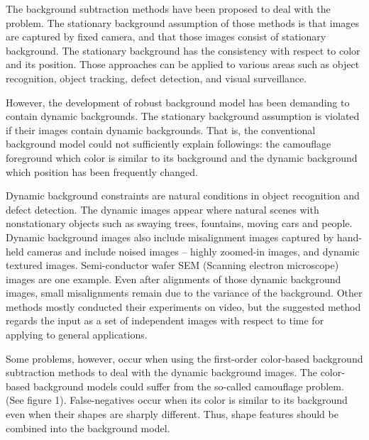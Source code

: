 \documentclass[a4paper,twocolumn, 10pt]{article}
\begin{document}
  The background subtraction methods have been proposed to deal with the problem. The stationary background assumption of those methods is that images are captured by fixed camera, and that those images consist of stationary background. The stationary background has the consistency with respect to color and its position. Those approaches can be applied to various areas such as object recognition, object tracking, defect detection, and visual surveillance.

  However, the development of robust background model has been demanding to contain dynamic backgrounds. The stationary background assumption is violated if their images contain dynamic backgrounds. That is, the conventional background model could not sufficiently explain followings: the camouflage foreground which color is similar to its background and the dynamic background which position has been frequently changed.
 
  Dynamic background constraints are natural conditions in object recognition and defect detection. The dynamic images appear where natural scenes with nonstationary objects such as swaying trees, fountains, moving cars and people. Dynamic background images also include misalignment images captured by hand-held cameras and include noised images – highly zoomed-in images, and dynamic textured images. Semi-conductor wafer SEM (Scanning electron microscope) images are one example. Even after alignments of those dynamic background images, small misalignments remain due to the variance of the background. Other methods mostly conducted their experiments on video, but the suggested method regards the input as a set of independent images with respect to time for applying to general applications. 
      
Some problems, however, occur when using the first-order color-based background subtraction methods to deal with the dynamic background images. The color-based background models could suffer from the so-called camouflage problem. (See figure 1). False-negatives occur when its color is similar to its background even when their shapes are sharply different. Thus, shape features should be combined into the background model. 
\end{document}
